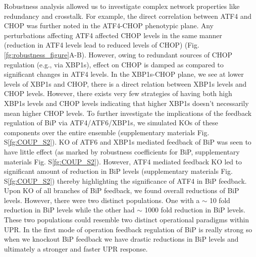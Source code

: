 \documentclass[12pt]{article}
\begin{document}
Robustness analysis allowed us to investigate complex network properties like redundancy and crosstalk. For example, the direct correlation between ATF4 and CHOP was further noted in the ATF4-CHOP phenotypic plane. Any perturbations affecting ATF4 affected CHOP levels in the same manner (reduction in ATF4 levels lead to reduced levels of CHOP) (Fig. \ref{fg:robustness_figure}A-B). However, owing to redundant sources of CHOP regulation (e.g., via XBP1s), effect on CHOP is damped as compared to significant changes in ATF4 levels. In the XBP1s-CHOP plane, we see at lower levels of XBP1s and CHOP, there is a direct relation between XBP1s levels and CHOP levels. However, there exists very few strategies of having both high XBP1s levels and CHOP levels indicating that higher XBP1s doesn't necessarily mean higher CHOP levels. To further investigate the implications of the feedback regulation of BiP via ATF4/ATF6/XBP1s, we simulated KOs of these components over the entire ensemble (supplementary materials Fig. S\ref{fg:COUP_S2}). KO of ATF6 and XBP1s mediated feedback of BiP was seen to have little effect (as marked by robustness coefficients for BiP, supplementary materials Fig. S\ref{fg:COUP_S2}). However, ATF4 mediated feedback KO led to significant amount of reduction in BiP levels (supplementary materials Fig. S\ref{fg:COUP_S2}) thereby highlighting the significance of ATF4 in BiP feedback. Upon KO of all branches of BiP feedback, we found overall reductions of BiP levels. However, there were two distinct populations. One with a $\sim$ 10 fold reduction in BiP levels while the other had $\sim$ 1000 fold reduction in BiP levels. These two populations could resemble two distinct operational paradigms within UPR. In the first mode of operation feedback regulation of BiP is really strong so when we knockout BiP feedback we have drastic reductions in BiP levels and ultimately a stronger and faster UPR response. 
\end{document}
